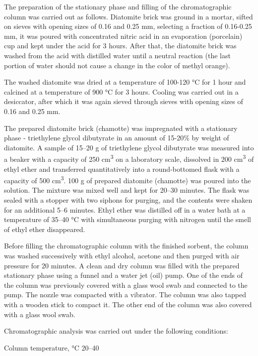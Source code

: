 The preparation of the stationary phase and filling of the
chromatographic column was carried out as follows. Diatomite brick was
ground in a mortar, sifted on sieves with opening sizes of 0.16 and 0.25
mm, selecting a fraction of 0.16-0.25 mm, it was poured with
concentrated nitric acid in an evaporation (porcelain) cup and kept
under the acid for 3 hours. After that, the diatomite brick was washed
from the acid with distilled water until a neutral reaction (the last
portion of water should not cause a change in the color of methyl
orange).

The washed diatomite was dried at a temperature of 100-120 °C for 1 hour
and calcined at a temperature of 900 °C for 3 hours. Cooling was carried
out in a desiccator, after which it was again sieved through sieves with
opening sizes of 0.16 and 0.25 mm.

The prepared diatomite brick (chamotte) was impregnated with a
stationary phase - triethylene glycol dibutyrate in an amount of 15-20\%
by weight of diatomite. A sample of 15--20 g of triethylene glycol
dibutyrate was measured into a beaker with a capacity of 250
cm\textsuperscript{3} on a laboratory scale, dissolved in 200
cm\textsuperscript{3} of ethyl ether and transferred quantitatively into
a round-bottomed flask with a capacity of 500 cm\textsuperscript{3}. 100
g of prepared diatomite (chamotte) was poured into the solution. The
mixture was mixed well and kept for 20--30 minutes. The flask was sealed
with a stopper with two siphons for purging, and the contents were
shaken for an additional 5--6 minutes. Ethyl ether was distilled off in
a water bath at a temperature of 35--40 °C with simultaneous purging
with nitrogen until the smell of ethyl ether disappeared.

Before filling the chromatographic column with the finished sorbent, the
column was washed successively with ethyl alcohol, acetone and then
purged with air pressure for 20 minutes. A clean and dry column was
filled with the prepared stationary phase using a funnel and a water jet
(oil) pump. One of the ends of the column was previously covered with a
glass wool swab and connected to the pump. The nozzle was compacted with
a vibrator. The column was also tapped with a wooden stick to compact
it. The other end of the column was also covered with a glass wool swab.

Chromatographic analysis was carried out under the following conditions:

Column temperature, °C 20--40


